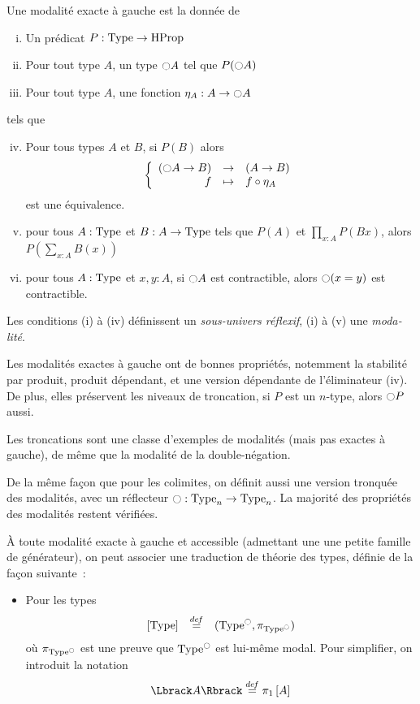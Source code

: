\begin{otherlanguage}{french}
\begin{defifr}
  Une modalité exacte à gauche est la donnée de
  \begin{enumerate}[(i)]
  \item Un prédicat $P:\operatorname{Type} \to \operatorname{HProp}$
  \item Pour tout type $A$, un type
    $\ocircle A$ tel que $P(\ocircle A)$
  \item Pour tout type $A$, une fonction $\eta_A:A \to
    \ocircle A$
  \end{enumerate}
  tels que
  \begin{enumerate}[(i)]
    \setcounter{enumi}{3}
  \item Pour tous types $A$ et $B$, si $P(B)$ alors
    \[ \left\{
        \begin{array}{rcl}
          (\ocircle A \to B) & \to & (A \to B) \\
          f & \mapsto & f \circ \eta_A
        \end{array} \right. \] %
    est une équivalence.
  \item pour tous $A:\operatorname{Type}$ et $B:A \to \operatorname{Type}$ tels que $P(A)$
    et $\prod_{x:A} P(B x)$, alors $P\left( \sum_{x:A} B(x)\right)$
  \item pour tous $A:\operatorname{Type}$ et $x,y:A$, si $\ocircle A$ est
    contractible, alors $\ocircle (x=y)$ est contractible.
  \end{enumerate}
  Les conditions (i) à (iv) définissent un {\em sous-univers réflexif}, (i) à
  (v) une {\em modalité}.
\end{defifr}

Les modalités exactes à gauche ont de bonnes propriétés, notemment la
stabilité par produit, produit dépendant, et une version dépendante de
l'éliminateur (iv). De plus, elles préservent les niveaux de
troncation, \ie{} si $P$ est un $n$-type, alors $\ocircle P$ aussi.

Les troncations sont une classe d'exemples de modalités (mais pas
exactes à gauche), de même que la modalité de la double-négation.

De la même façon que pour les colimites, on définit aussi une version
tronquée des modalités, \ie{} avec un réflecteur $\ocircle : \operatorname{Type}_n \to
\operatorname{Type}_n$. La majorité des propriétés des modalités restent vérifiées.

À toute modalité exacte à gauche et accessible (admettant une une petite
famille de générateur), on peut associer une traduction de théorie des
types, définie de la façon suivante~:

\begin{itemize}
\item Pour les types
\[
\begin{array}{lcl}
  \left[ \operatorname{Type}\right] &\overset{de\hspace{-0.2ex}f}{=}& (\operatorname{Type}^{\ocircle},\pi_{\operatorname{Type}^{\ocircle}})
\end{array}
\]
où $\pi_{\operatorname{Type}^{\ocircle}}$ est une preuve que $\operatorname{Type}^{\ocircle}$ est lui-même modal.
Pour simplifier, on introduit la notation
  \[ 
  \Lbrack A \Rbrack \defeq \pi_1 \left[ A \right]\]


\end{itemize}
\end{otherlanguage}
